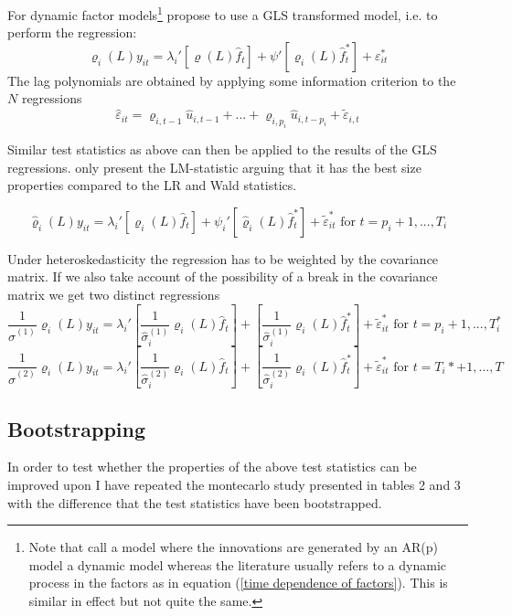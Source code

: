 \documentclass[12pt]{article}
\begin{document}
For dynamic factor models\footnote{Note that \citet{breitung2011testing} call a model where the innovations are generated by an AR(p) model a dynamic model whereas the literature usually refers to a dynamic process in the factors as in equation (\ref{time dependence of factors}). This is similar in effect but not quite the same.} \citet{breitung2011testing} propose to use a GLS transformed model, i.e. to perform the regression:
$$\varrho_i(L) y_{it} = \lambda_i'[\varrho(L) \hat f_t] + \psi' [\varrho_i(L) \hat f_t^*] + \varepsilon^*_{it}$$
The lag polynomials are obtained by applying some information criterion to the $N$ regressions
$$\hat \varepsilon_{it} = \varrho_{i, t-1} \hat u_{i, t-1} + ... + \varrho_{i, p_i} \hat u_{i, t-p_i} + \tilde \varepsilon_{i,t}$$

Similar test statistics as above can then be applied to the results of the GLS regressions. \citet{breitung2011testing} only present the LM-statistic arguing that it has the best size properties compared to the LR and Wald statistics.

$$\hat \varrho_i(L) y_{it} = \lambda_i' \left[\varrho_i(L) \hat f_t\right] + \psi_i' \left[\hat \varrho_i(L) \hat f_t^*\right] + \tilde \varepsilon^*_{it} \text{ for } t= p_i+1, ..., T_i$$

Under heteroskedasticity the regression has to be weighted by the covariance matrix. If we also take account of the possibility of a break in the covariance matrix we get two distinct regressions
$$\frac{1}{\hat \sigma^{(1)}} \varrho_i(L) y_{it} = \lambda_i' \left[\frac{1}{\hat \sigma_i^{(1)}} \varrho_i(L) \hat f_t\right] + \left[\frac{1}{\hat \sigma_i^{(1)}} \varrho_i(L) \hat f_t^*\right] + \tilde \varepsilon^*_{it} \text{ for } t = p_i+1, ..., T^*_i$$
$$\frac{1}{\hat \sigma^{(2)}} \varrho_i(L) y_{it} = \lambda_i' \left[\frac{1}{\hat \sigma_i^{(2)}} \varrho_i(L) \hat f_t\right] + \left[\frac{1}{\hat \sigma_i^{(2)}} \varrho_i(L) \hat f_t^*\right] + \tilde \varepsilon^*_{it} \text{ for } t = T_i*+1, ..., T$$



\subsection{Bootstrapping \citet{breitung2011testing}}
In order to test whether the properties of the above test statistics can be improved upon I have repeated the montecarlo study presented in \citet{breitung2011testing} tables 2 and 3 with the difference that the test statistics have been bootstrapped. \\
\end{document}
